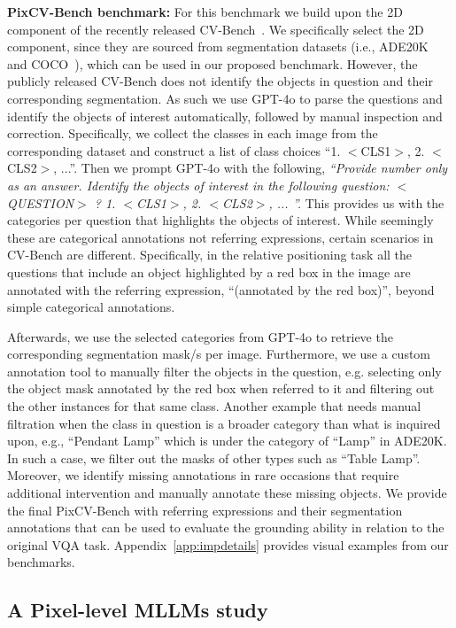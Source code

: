 \textbf{PixCV-Bench benchmark:} For this benchmark we build upon the 2D component of the recently released CV-Bench~\cite{tong2024cambrian}. We specifically select the 2D component, since they are sourced from segmentation datasets (i.e., ADE20K~\cite{zhou2017scene} and COCO~\cite{lin2014microsoft}), which can be used in our proposed benchmark. However, the publicly released CV-Bench does not identify the objects in question and their corresponding segmentation. As such we use GPT-4o to parse the questions and identify the objects of interest automatically, followed by manual inspection and correction. Specifically, we collect the classes in each image from the corresponding dataset and construct a list of class choices ``1. $<$CLS1$>$, 2. $<$CLS2$>$, ...''. Then we prompt GPT-4o with the following, \textit{``Provide number only as an answer. Identify the objects of interest in the following question: $<$QUESTION$>$ ? 1. $<$CLS1$>$, 2. $<$CLS2$>$, ... ''.}  This provides us with the categories per question that highlights the objects of interest. While seemingly these are categorical annotations not referring expressions, certain scenarios in CV-Bench are different. Specifically, in the relative positioning task all the questions that include an object highlighted by a red box in the image are annotated with the referring expression, ``(annotated by the red box)'', beyond simple categorical annotations.

Afterwards, we use the selected categories from GPT-4o to retrieve the corresponding segmentation mask/s per image. Furthermore, we use a custom annotation tool to manually filter the objects in the question, e.g. selecting only the object mask annotated by the red box when referred to it and filtering out the other instances for that same class. Another example that needs manual filtration when the class in question is a broader category than what is inquired upon, e.g., ``Pendant Lamp'' which is under the category of ``Lamp'' in ADE20K. In such a case, we filter out the masks of other types such as ``Table Lamp''. Moreover, we identify missing annotations in rare occasions that require additional intervention and manually annotate these missing objects. We provide the final PixCV-Bench with referring expressions and their segmentation annotations that can be used to evaluate the grounding ability in relation to the original VQA task. Appendix~\ref{app:impdetails} provides visual examples from our benchmarks.

\subsection{A Pixel-level MLLMs study}

